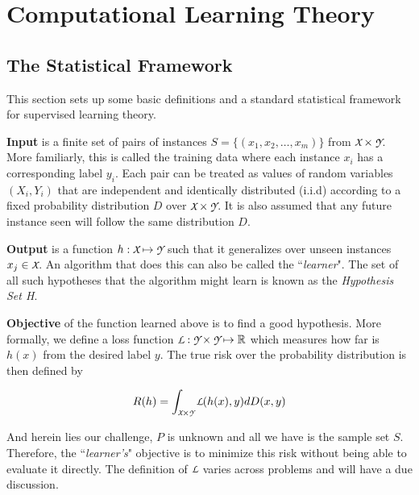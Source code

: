 \documentclass[../toml]{subfiles}
\begin{document}
\chapter{Computational Learning Theory}

\section{The Statistical Framework}

This section sets up some basic definitions and a standard statistical framework for
supervised learning theory.

\textbf{Input} is a finite set of pairs of instances $S = \{(x_1,x_2,\ldots,x_m)\}$ from
$\cursive{X} \times \cursive{Y}$. More familiarly, this is called the training data where
each instance $x_i$ has a corresponding label $y_i$. Each pair can be treated as
values of random variables $(X_i,Y_i)$ that are independent and identically distributed
(i.i.d) according to a fixed probability distribution $D$ over $\cursive{X} \times
\cursive{Y}$. It is also assumed that any future instance seen will follow the same
distribution $D$.

\textbf{Output} is a function $h: \cursive{X} \mapsto \cursive{Y}$ such that it generalizes
over unseen instances $x_j \in \cursive{X}$. An algorithm that does this can also be
called the ``\textit{learner}". The set of all such hypotheses that the algorithm might
learn is known as the \textit{Hypothesis Set H}.

\textbf{Objective} of the function learned above is to find a good hypothesis. More
formally, we define a loss function $\cursive{L}: \cursive{Y} \times \cursive{Y} \mapsto
\mathbb{R}$ which measures how far is $h(x)$ from the desired label $y$. The true
risk over the probability distribution is then defined by

\begin{definition} \label{def:true_risk}
\begin{align}
R(h) = \int_{\cursive{X} \times \cursive{Y}} \cursive{L}(h(x),y) dD(x,y)
\end{align}
\end{definition}


And herein lies our challenge, $P$ is unknown and all we have is the sample set $S$.
Therefore, the ``\textit{learner's}" objective is to minimize this risk without being able
to evaluate it directly. The definition of $\cursive{L}$ varies across problems and will
have a due discussion.
\end{document}
